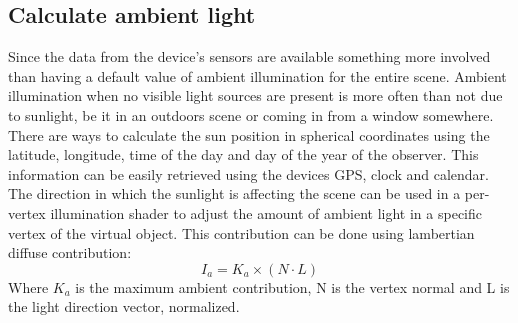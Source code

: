 \subsection{Calculate ambient light}
Since the data from the device's sensors are available something more involved than having a default value of ambient illumination for the entire scene. Ambient illumination when no visible light sources are present is more often than not due to sunlight, be it in an outdoors scene or coming in from a window somewhere. There are ways \cite{solar} to calculate the sun position in spherical coordinates using the latitude, longitude, time of the day and day of the year of the observer. This information can be easily retrieved using the devices GPS, clock and calendar. The direction in which the sunlight is affecting the scene can be used in a per-vertex illumination shader to adjust the amount of ambient light in a specific vertex of the virtual object. This contribution can be done using lambertian diffuse contribution:
\[
    I_a = K_a \times (N \cdot L)
\]
Where $K_a$ is the maximum ambient contribution, N is the vertex normal and L is the light direction vector, normalized.